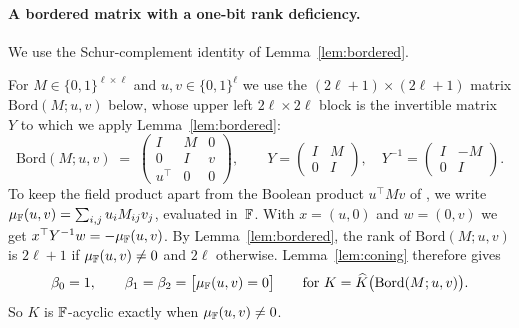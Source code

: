 \paragraph{A bordered matrix with a one-bit rank deficiency.}
We use the Schur-complement identity of Lemma~\ref{lem:bordered}.

For $M\in\{0,1\}^{\ell\times\ell}$ and $u,v\in\{0,1\}^{\ell}$ we use the $(2\ell+1)\times(2\ell+1)$ matrix $\mathrm{Bord}(M;u,v)$ below, whose upper left $2\ell\times2\ell$ block is the invertible matrix~$Y$ to which we apply Lemma~\ref{lem:bordered}:
\[
  \mathrm{Bord}(M;u,v)\;=\;\begin{pmatrix}I&M&0\\0&I&v\\u^{\top}&0&0\end{pmatrix},
  \qquad
  Y=\begin{pmatrix}I&M\\0&I\end{pmatrix},\quad
  Y^{-1}=\begin{pmatrix}I&-M\\0&I\end{pmatrix}.
\]
To keep the field product apart from the Boolean product $u^{\top}Mv$ of \OuMv, we write $\mu_{\mathbb{F}}(u,v)=\sum_{i,j}u_iM_{ij}v_j$, evaluated in~$\mathbb{F}$.
With $x=(u,0)$ and $w=(0,v)$ we get $x^{\top}Y^{-1}w=-\mu_{\mathbb{F}}(u,v)$.
By Lemma~\ref{lem:bordered}, the rank of $\mathrm{Bord}(M;u,v)$ is $2\ell+1$ if $\mu_{\mathbb{F}}(u,v)\ne0$ and $2\ell$ otherwise.
Lemma~\ref{lem:coning} therefore gives
\begin{equation}\label{eq:acyclic-bit}
  \beta_0=1,\qquad \beta_1=\beta_2=\bigl[\mu_{\mathbb{F}}(u,v)=0\bigr]
  \qquad\text{for } K=\widehat K\bigl(\mathrm{Bord}(M;u,v)\bigr).
\end{equation}
So $K$ is $\mathbb{F}$-acyclic exactly when $\mu_{\mathbb{F}}(u,v)\neq0$.

